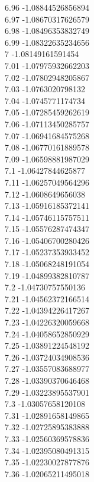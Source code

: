 {6.96	-1.08844526856894\\
6.97	-1.08670317626579\\
6.98	-1.08496353832749\\
6.99	-1.08322635234656\\
7	-1.08149161591454\\
7.01	-1.07975932662203\\
7.02	-1.07802948205867\\
7.03	-1.0763020798132\\
7.04	-1.0745771174734\\
7.05	-1.07285459262619\\
7.06	-1.07113450285757\\
7.07	-1.06941684575268\\
7.08	-1.06770161889578\\
7.09	-1.06598881987029\\
7.1	-1.06427844625877\\
7.11	-1.06257049564296\\
7.12	-1.0608649656038\\
7.13	-1.05916185372141\\
7.14	-1.05746115757511\\
7.15	-1.05576287474347\\
7.16	-1.05406700280426\\
7.17	-1.05237353933452\\
7.18	-1.05068248191054\\
7.19	-1.04899382810787\\
7.2	-1.04730757550136\\
7.21	-1.04562372166514\\
7.22	-1.04394226417267\\
7.23	-1.04226320059668\\
7.24	-1.04058652850929\\
7.25	-1.03891224548192\\
7.26	-1.03724034908536\\
7.27	-1.03557083688977\\
7.28	-1.03390370646468\\
7.29	-1.03223895537901\\
7.3	-1.03057658120108\\
7.31	-1.02891658149865\\
7.32	-1.02725895383888\\
7.33	-1.02560369578836\\
7.34	-1.02395080491315\\
7.35	-1.02230027877876\\
7.36	-1.02065211495018\\
}
